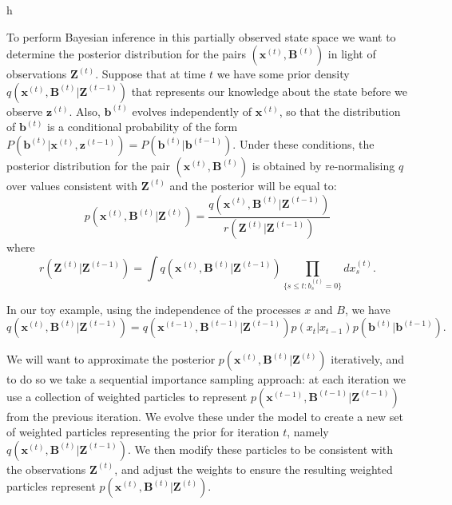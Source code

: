 h\documentclass[11pt,a4paper]{article}
\renewcommand{\vec}[1]{\mathbf{#1}}
\begin{document}
To perform Bayesian inference in this partially observed state space we want to determine the posterior distribution for the pairs $(\vec{x}^{(t)}, \vec{B}^{(t)})$ in light of observations $\vec{Z}^{(t)}$. Suppose that at time $t$ we have some prior density $q(\vec{x}^{(t)},\vec{B}^{(t)} | \vec{Z}^{(t-1)})$ that represents our knowledge about the state before we observe $\vec{z}^{(t)}$. Also, $\vec{b}^{(t)}$ evolves independently of $\vec{x}^{(t)}$, so that the distribution of $\vec{b}^{(t)}$ is a conditional probability of the form $P(\vec{b}^{(t)} | \vec{x}^{(t)}, \vec{z}^{(t-1)} ) = P( \vec{b}^{(t)} | \vec{b}^{(t-1)} )$. Under these conditions, the posterior distribution for the pair $(\vec{x}^{(t)}, \vec{B}^{(t)})$ is obtained by re-normalising $q$ over values consistent with $\vec{Z}^{(t)}$ and the posterior will be equal to:
\[
p(\vec{x}^{(t)}, \vec{B}^{(t)} | \vec{Z}^{(t)})  =   
\frac{ q(\vec{x}^{(t)}, \vec{B}^{(t)}|\vec{Z}^{(t-1)})} {r(\vec{Z}^{(t)} | \vec{Z}^{(t-1)})}
\]
where 
\[
r(\vec{Z}^{(t)} | \vec{Z}^{(t-1)}) = \int q(\vec{x}^{(t)}, \vec{B}^{(t)}|\vec{Z}^{(t-1)}) \prod_{\{s \leq t: b_s^{(t)} = 0\}} dx_s^{(t)}.
\]

In our toy example, using the independence of the processes $x$ and $B$, we have
\begin{equation}
q(\vec{x}^{(t)},\vec{B}^{(t)} | \vec{Z}^{(t-1)}) = q(\vec{x}^{(t-1)},\vec{B}^{(t-1)} | \vec{Z}^{(t-1)}) p(x_t | x_{t-1}) p(\vec{b}^{(t)} | \vec{b}^{(t-1)}).
\end{equation}

We will want to approximate the posterior $p(\vec{x}^{(t)}, \vec{B}^{(t)} | \vec{Z}^{(t)})$ iteratively, and to do so we take a sequential importance sampling approach: at each iteration we use a collection of weighted particles to represent $p(\vec{x}^{(t-1)}, \vec{B}^{(t-1)} | \vec{Z}^{(t-1)})$ from the previous iteration. We evolve these under the model to create a new set of weighted particles representing the prior for iteration $t$, namely $q(\vec{x}^{(t)}, \vec{B}^{(t)} | \vec{Z}^{(t-1)})$. We then modify these particles to be consistent with the observations $\vec{Z}^{(t)}$, and adjust the weights to ensure the resulting weighted particles represent $p(\vec{x}^{(t)}, \vec{B}^{(t)} | \vec{Z}^{(t)})$.
\end{document}
